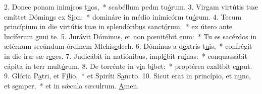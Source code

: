 2. Donec ponam inim\uline{í}cos t\uline{u}os,~* scabéllum pedm tu\uline{ó}rum.
3. Virgam virtútis tuæ emíttet Dómin\uline{u}s ex S\uline{i}on:~* domináre in médio inimicórm tu\uline{ó}rum.
4. Tecum princípium in die virtútis tuæ in splendórib\uline{u}s sanct\uline{ó}rum:~* ex útero ante lucíferum gnu\uline{i} te.
5. Jurávit Dóminus, et non pœnit\uline{é}bit \uline{e}um:~* Tu es sacérdos in ætérnum secúndum órdinem Mlchís\uline{e}dech.
6. Dóminus a d\uline{e}xtris t\uline{u}is,~* confrégit in die iræ sæ r\uline{e}ges.
7. Judicábit in natiónibus, impl\uline{é}bit ru\uline{í}nas:~* conquassábit cápita in terr mult\uline{ó}rum.
8. De torrénte in v\uline{i}a b\uline{i}bet:~* proptérea exaltbit c\uline{a}put.
9. Glória P\uline{a}tri, et F\uline{í}lio,~* et Spiríti S\uline{a}ncto.
10. Sicut erat in princípio, et n\uline{u}nc, et s\uline{e}mper,~* et in sǽcula sæculrum. \uline{A}men.
